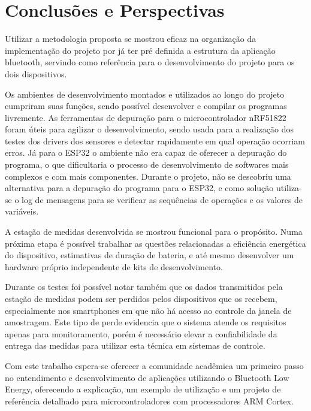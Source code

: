 \section{Conclusões e Perspectivas}

Utilizar a metodologia proposta se mostrou eficaz na organização da
implementação do projeto por já ter pré definida a estrutura da aplicação
bluetooth, servindo como referência para o desenvolvimento do projeto para os
dois dispositivos. 

Os ambientes de desenvolvimento montados e utilizados ao longo do projeto
cumpriram suas funções, sendo possível desenvolver e compilar os programas
livremente. As ferramentas de depuração para o microcontrolador nRF51822 foram
úteis para agilizar o desenvolvimento, sendo usada para a realização dos
testes dos drivers dos sensores e detectar rapidamente em qual operação ocorriam
erros. Já para o ESP32 o ambiente não era capaz de oferecer a depuração do
programa, o que dificultaria o processo de desenvolvimento de softwares mais
complexos e com mais componentes. Durante o projeto, não se descobriu uma
alternativa para a depuração do programa para o ESP32, e como solução utiliza-se
o log de mensagens para se verificar as sequências de operações e os valores de
variáveis. 

A estação de medidas desenvolvida se mostrou funcional para o propósito. Numa
próxima etapa é possível trabalhar as questões relacionadas a eficiência
energética do dispositivo, estimativas de duração de bateria, e até mesmo
desenvolver um hardware próprio independente de kits de desenvolvimento.

Durante os testes foi possível notar também que os dados transmitidos pela
estação de medidas podem ser perdidos pelos dispositivos que os recebem,
especialmente nos smartphones em que não há acesso ao controle da janela de
amostragem. Este tipo de perde evidencia que o sistema atende os requisitos
apenas para monitoramento, porém é necessário elevar a confiabilidade da entrega
das medidas para utilizar esta técnica em sistemas de controle.

Com este trabalho espera-se oferecer a comunidade acadêmica um primeiro passo no
entendimento e desenvolvimento de aplicações utilizando o Bluetooth Low Energy,
oferecendo a explicação, um exemplo de utilização e um projeto de referência
detalhado para microcontroladores com processadores ARM Cortex.
